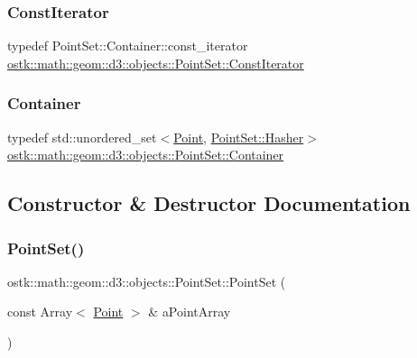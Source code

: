 \subsubsection{\texorpdfstring{Const\+Iterator}{ConstIterator}}
{\footnotesize\ttfamily typedef Point\+Set\+::\+Container\+::const\+\_\+iterator \hyperlink{classostk_1_1math_1_1geom_1_1d3_1_1objects_1_1_point_set_aa87eb9a571cb8b420e8c404005a2b723}{ostk\+::math\+::geom\+::d3\+::objects\+::\+Point\+Set\+::\+Const\+Iterator}}

\mbox{\label{classostk_1_1math_1_1geom_1_1d3_1_1objects_1_1_point_set_a68a2ddeec07bd422601f60d5ed48e183}} 
\subsubsection{\texorpdfstring{Container}{Container}}
{\footnotesize\ttfamily typedef std\+::unordered\+\_\+set$<$\hyperlink{classostk_1_1math_1_1geom_1_1d3_1_1objects_1_1_point}{Point}, \hyperlink{structostk_1_1math_1_1geom_1_1d3_1_1objects_1_1_point_set_1_1_hasher}{Point\+Set\+::\+Hasher}$>$ \hyperlink{classostk_1_1math_1_1geom_1_1d3_1_1objects_1_1_point_set_a68a2ddeec07bd422601f60d5ed48e183}{ostk\+::math\+::geom\+::d3\+::objects\+::\+Point\+Set\+::\+Container}}



\subsection{Constructor \& Destructor Documentation}
\mbox{\label{classostk_1_1math_1_1geom_1_1d3_1_1objects_1_1_point_set_a285835d8348a60ceaf227bd76e3a5546}} 
\subsubsection{\texorpdfstring{Point\+Set()}{PointSet()}}
{\footnotesize\ttfamily ostk\+::math\+::geom\+::d3\+::objects\+::\+Point\+Set\+::\+Point\+Set (\begin{DoxyParamCaption}\item[{const Array$<$ \hyperlink{classostk_1_1math_1_1geom_1_1d3_1_1objects_1_1_point}{Point} $>$ \&}]{a\+Point\+Array }\end{DoxyParamCaption})}



